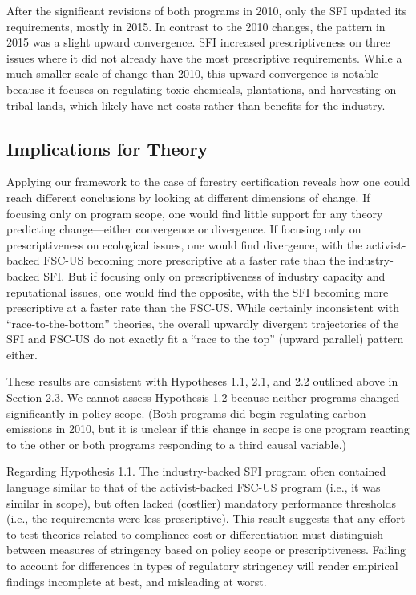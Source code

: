 \documentclass[
      12pt,
            Review ]{article}
\begin{document}
After the significant revisions of both programs in 2010, only the SFI updated its requirements, mostly in 2015. In contrast to the 2010 changes, the pattern in 2015 was a slight upward convergence. SFI increased prescriptiveness on three issues where it did not already have the most prescriptive requirements. While a much smaller scale of change than 2010, this upward convergence is notable because it focuses on regulating toxic chemicals, plantations, and harvesting on tribal lands, which likely have net costs rather than benefits for the industry.

\hypertarget{implications-for-theory}{%
\subsection{Implications for Theory}\label{implications-for-theory}}

Applying our framework to the case of forestry certification reveals how one could reach different conclusions by looking at different dimensions of change. If focusing only on program scope, one would find little support for any theory predicting change---either convergence or divergence. If focusing only on prescriptiveness on ecological issues, one would find divergence, with the activist-backed FSC-US becoming more prescriptive at a faster rate than the industry-backed SFI. But if focusing only on prescriptiveness of industry capacity and reputational issues, one would find the opposite, with the SFI becoming more prescriptive at a faster rate than the FSC-US. While certainly inconsistent with ``race-to-the-bottom'' theories, the overall upwardly divergent trajectories of the SFI and FSC-US do not exactly fit a ``race to the top'' (upward parallel) pattern either.

These results are consistent with Hypotheses 1.1, 2.1, and 2.2 outlined above in Section 2.3. We cannot assess Hypothesis 1.2 because neither programs changed significantly in policy scope. (Both programs did begin regulating carbon emissions in 2010, but it is unclear if this change in scope is one program reacting to the other or both programs responding to a third causal variable.)

Regarding Hypothesis 1.1. The industry-backed SFI program often contained language similar to that of the activist-backed FSC-US program (i.e., it was similar in scope), but often lacked (costlier) mandatory performance thresholds (i.e., the requirements were less prescriptive). This result suggests that any effort to test theories related to compliance cost or differentiation must distinguish between measures of stringency based on policy scope or prescriptiveness. Failing to account for differences in types of regulatory stringency will render empirical findings incomplete at best, and misleading at worst.
\end{document}
